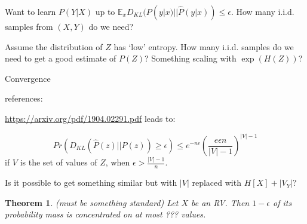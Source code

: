 \documentclass[11pt,letterpaper]{article}
\newcounter{theorem}
\newtheorem{thm}[theorem]{Theorem}
\begin{document}
Want to learn $P(Y|X)$ up to $\mathbb{E}_x D_{KL}(P(y|x)||\hat P(y|x)) \leq \epsilon$.
How many i.i.d. samples from $(X,Y)$ do we need?

Assume the distribution of $Z$ has `low' entropy.
How many i.i.d. samples do we need to get a good estimate of $P(Z)$?
Something scaling with $\exp(H(Z))$?

Convergence

references:

\url{https://arxiv.org/pdf/1904.02291.pdf} leads to:

$$Pr(D_{KL}(\hat P(z)||P(z)) \geq \epsilon) \leq e^{-n\epsilon} \left(\frac{e\epsilon n}{|V|-1}\right)^{|V|-1}$$
if $V$ is the set of values of $Z$, when $\epsilon > \frac{|V|-1}{n}$.


Is it possible to get something similar but with $|V|$ replaced with $H[X]+|V_Y|$?

\begin{thm}(must be something standard)
Let $X$ be an RV. Then $1-\epsilon$ of its probability mass is concentrated on at most
???
values.
\end{thm}
\end{document}
